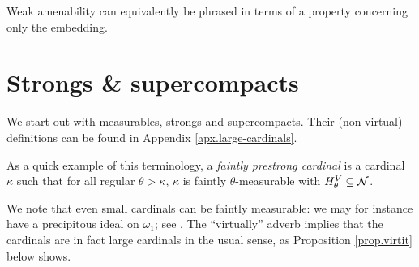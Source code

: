 \documentclass[../../main]{subfiles}
\begin{document}
Weak amenability can equivalently be phrased in terms of a property concerning only the embedding.


\section{Strongs \& supercompacts}

We start out with measurables, strongs and supercompacts. Their (non-virtual) definitions can be found in Appendix \ref{apx.large-cardinals}.


As a quick example of this terminology, a \textit{faintly prestrong cardinal} is a cardinal $\kappa$ such that for all regular $\theta>\kappa$, $\kappa$ is faintly $\theta$-measurable with $H_\theta^V\subseteq\operatorname{\mathcal N}$.

\qquad We note that even small cardinals can be faintly measurable: we may for instance have a precipitous ideal on $\omega_1$; see \cite[Theorem 22.33]{Jech}. The ``virtually'' adverb implies that the cardinals are in fact large cardinals in the usual sense, as Proposition \ref{prop.virtit} below shows.
\end{document}

